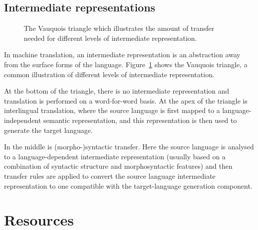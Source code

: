 \documentclass[free]{flammie}
\begin{document}
\subsection{Intermediate representations}
\label{sec:interrep}
\begin{figure}
\begin{center}
\end{center}
\caption{The Vauquois triangle which illustrates the amount of transfer needed for different levels of intermediate representation.}
\label{fig:vauquois}
\end{figure}

In machine translation, an intermediate representation is an abstraction away from the surface forms of the language. Figure~\ref{fig:vauquois} shows the Vauquois triangle, a common illustration of different levels of intermediate representation. 

At the bottom of the triangle, there is no intermediate representation and translation is performed on a word-for-word basis. At the apex of the triangle is interlingual translation, where the source language is first mapped to a language-independent semantic representation, and this representation is then used to generate the target language.

In the middle is (morpho-)syntactic transfer. Here the source language is analysed to a language-dependent intermediate representation (usually based on a combination of syntactic structure and morphosyntactic features) and then transfer rules are applied to convert the source language intermediate representation to one compatible with the target-language generation component. 

\section{Resources}
\label{sec:resources}
\end{document}
